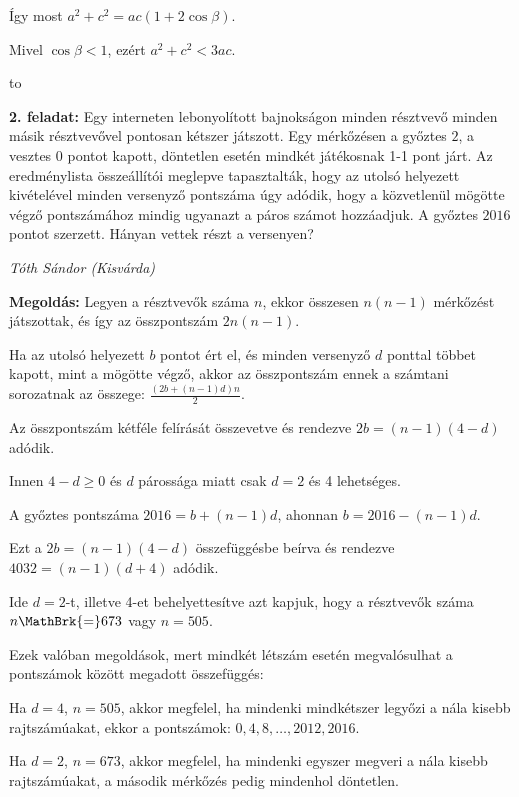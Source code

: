 \documentclass[a4paper,10pt]{article}
\newcommand{\ki}[2]{\hfill {\it #1 (#2)}\medskip}
\newcommand{\vonal}{\hbox to \hsize{\hskip2truecm\hrulefill\hskip2truecm}}
\begin{document}
\noindent Így most $a^2+c^2=ac(1+2\cos\beta)$. 

\smallskip

\noindent Mivel $\cos\beta<1$, ezért $a^2+c^2<3ac$.

\vonal

{\bf 2. feladat: } Egy interneten lebonyolított bajnokságon minden
résztvevő minden másik résztvevővel pontosan kétszer játszott. Egy
mérkőzésen a győztes $2$, a vesztes 0 pontot kapott, döntetlen esetén
mindkét játékosnak 1-1 pont járt. Az eredménylista összeállítói meglepve 
tapasztalták,
hogy az utolsó helyezett kivételével minden versenyző pontszáma úgy
adódik, hogy a közvetlenül mögötte végző pontszámához mindig ugyanazt a
páros számot hozzáadjuk. A győztes $2016$ pontot szerzett. Hányan vettek
részt a versenyen? 

\ki{Tóth Sándor}{Kisvárda}\medskip

{\bf Megoldás:} Legyen a résztvevők száma $n$, ekkor összesen
$n(n-1)$ mérkőzést játszottak, és így az összpontszám $2n(n-1)$.

\smallskip
\noindent Ha az utolsó helyezett $b$ pontot ért el, és minden versenyző $d$ ponttal
többet kapott, mint a mögötte végző, akkor az összpontszám ennek a számtani
sorozatnak az összege: $\displaystyle\frac{(2b+(n-1)d)n}2$.

\smallskip
\noindent Az összpontszám kétféle felírását összevetve és rendezve $2b=(n-1)(4-d)$
adódik.


\smallskip
\noindent Innen $4-d\ge 0$ és $d$ párossága miatt csak $d=2$ és 4 lehetséges.

\smallskip
\noindent A győztes pontszáma $2016=b+(n-1)d$, ahonnan $b=2016-(n-1)d$.

\smallskip
\noindent Ezt a $2b=(n-1)(4-d)$ összefüggésbe beírva és rendezve $4032=(n-1)(d+4)$
adódik. 


\smallskip
\noindent Ide $d=2$-t, illetve 4-et behelyettesítve  azt kapjuk, hogy a résztvevők
száma $n\MathBrk{=}673$ vagy  $n=505$.

\smallskip
\noindent Ezek valóban megoldások, mert mindkét létszám esetén
megvalósulhat a pontszámok között megadott összefüggés:

\smallskip
\noindent Ha $d=4$, $n=505$, akkor megfelel, ha mindenki mindkétszer legyőzi a nála
kisebb rajtszámúakat, ekkor a pontszámok: $0, 4, 8, \dots, 2012, 2016$.

\smallskip
\noindent Ha $d=2$, $n=673$, akkor megfelel, ha mindenki egyszer megveri a nála kisebb
rajtszámúakat, a második mérkőzés pedig mindenhol döntetlen.
 
\end{document}
